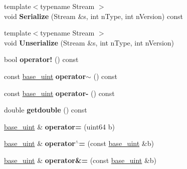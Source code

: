 \begin{DoxyCompactItemize}
\mbox{\label{classbase__uint_a2f80cbf71c59275037810824dae9f0d0}} 
{\footnotesize template$<$typename Stream $>$ }\\void {\bfseries Serialize} (Stream \&s, int n\+Type, int n\+Version) const
\item 
\mbox{\label{classbase__uint_adf1ad639d94997a9cda95e0c424ab51a}} 
{\footnotesize template$<$typename Stream $>$ }\\void {\bfseries Unserialize} (Stream \&s, int n\+Type, int n\+Version)
\item 
\mbox{\label{classbase__uint_afbcdb1cf849d37272b4e7d4fabf1192b}} 
bool {\bfseries operator!} () const
\item 
\mbox{\label{classbase__uint_a2803d039b33d5570f47ac39d797bc9ea}} 
const \mbox{\hyperlink{classbase__uint}{base\+\_\+uint}} {\bfseries operator$\sim$} () const
\item 
\mbox{\label{classbase__uint_a3b758876b828c6faffdc2a2880122595}} 
const \mbox{\hyperlink{classbase__uint}{base\+\_\+uint}} {\bfseries operator-\/} () const
\item 
\mbox{\label{classbase__uint_ac989d44cd0d60e6c510722a714b817fa}} 
double {\bfseries getdouble} () const
\item 
\mbox{\label{classbase__uint_a965c13d51a2bb2c64ff75461bb1ab55d}} 
\mbox{\hyperlink{classbase__uint}{base\+\_\+uint}} \& {\bfseries operator=} (uint64 b)
\item 
\mbox{\label{classbase__uint_ad5ec10977ebeab115fe857637990e267}} 
\mbox{\hyperlink{classbase__uint}{base\+\_\+uint}} \& {\bfseries operator$^\wedge$=} (const \mbox{\hyperlink{classbase__uint}{base\+\_\+uint}} \&b)
\item 
\mbox{\label{classbase__uint_a6cb549b322e5bbcca794366f5fd3fb15}} 
\mbox{\hyperlink{classbase__uint}{base\+\_\+uint}} \& {\bfseries operator\&=} (const \mbox{\hyperlink{classbase__uint}{base\+\_\+uint}} \&b)
\item 
\mbox{\label{classbase__uint_ab116d89cbae68b32fbecf5d1de98bb2e}} 

\end{DoxyCompactItemize}
